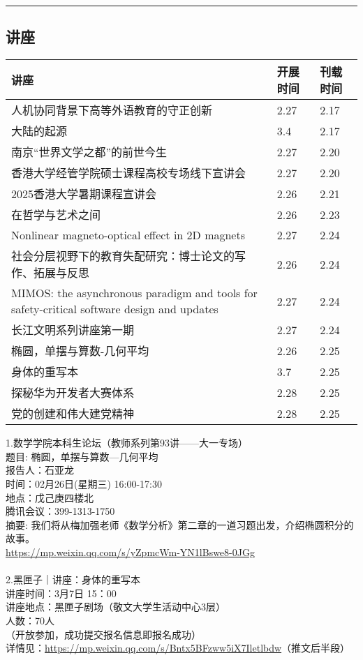 \documentclass[letterpaper, 12pt]{article}
\begin{document}
\hrule
\pagebreak
\begin{multicols}{2}

\section{讲座}
\begin{tabular}{|>{\centering\arraybackslash}m{}|m{}|m{}|}
    \hline
    讲座 & 开展时间 & 刊载时间\\
    \hline\hline
    人机协同背景下高等外语教育的守正创新 & 2.27 & 2.17\\\hline
    大陆的起源 & 3.4 & 2.17\\\hline
    南京“世界文学之都”的前世今生 & 2.27 & 2.20\\\hline
    香港大学经管学院硕士课程高校专场线下宣讲会 & 2.27 & 2.20\\\hline
    2025香港大学暑期课程宣讲会 & 2.26 & 2.21\\\hline
    在哲学与艺术之间 & 2.26 & 2.23\\\hline
    Nonlinear magneto-optical effect in 2D magnets & 2.27&2.24\\\hline
    社会分层视野下的教育失配研究：博士论文的写作、拓展与反思 & 2.26 & 2.24\\\hline
    MIMOS: the asynchronous paradigm and tools for safety-critical software design and updates & 2.27 & 2.24\\\hline
    长江文明系列讲座第一期 & 2.27 & 2.24\\\hline
    椭圆，单摆与算数-几何平均 & 2.26 & 2.25\\\hline
    身体的重写本 & 3.7 & 2.25\\\hline
    探秘华为开发者大赛体系 & 2.28 & 2.25\\\hline
    党的创建和伟大建党精神 & 2.28 & 2.25\\\hline
\end{tabular}

1.数学学院本科生论坛（教师系列第93讲——大一专场）\\
题目: 椭圆，单摆与算数—几何平均\\
报告人：石亚龙\\
时间：02月26日(星期三) 16:00-17:30\\
地点：戊己庚四楼北\\
腾讯会议：399-1313-1750\\
摘要: 我们将从梅加强老师《数学分析》第二章的一道习题出发，介绍椭圆积分的故事。\\
\url{https://mp.weixin.qq.com/s/yZpmcWm-YN1lBswe8-0JGg}\\
\\
2.黑匣子｜讲座：身体的重写本\\
讲座时间：3月7日 15：00\\
讲座地点：黑匣子剧场（敬文大学生活动中心3层）\\
人数：70人\\
（开放参加，成功提交报名信息即报名成功）\\
详情见：\url{https://mp.weixin.qq.com/s/Bntx5BFzww5iX7Iletlbdw}（推文后半段）\\


\end{multicols}
\end{document}
